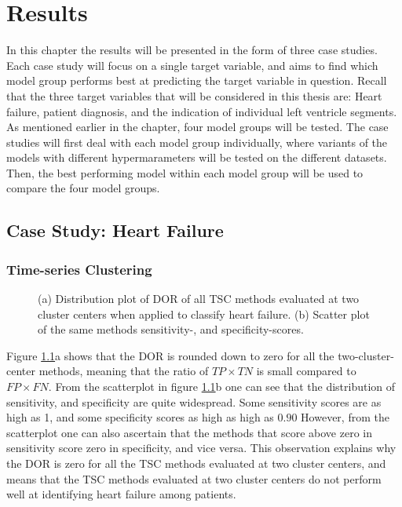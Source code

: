 \chapter{Results}

In this chapter the results will be presented in the form of three case studies. 
Each case study will focus on a single target variable, and aims to find which model group performs best at predicting the target variable in question.
Recall that the three target variables that will be considered in this thesis are: Heart failure, patient diagnosis, and the indication of individual left ventricle segments.
As mentioned earlier in the chapter, four model groups will be tested. 
The case studies will first deal with each model group individually, where variants of the models with different hypermarameters will be tested on the different datasets. 
Then, the best performing model within each model group will be used to compare the four model groups.

\section{Case Study: Heart Failure}

\subsection{Time-series Clustering}

\begin{figure}[htb]
    \centering
    
    \caption{(a) Distribution plot of DOR of all TSC methods evaluated at two cluster centers when applied to classify heart failure.
             (b) Scatter plot of the same methods sensitivity-, and specificity-scores.}
    \label{fig:tsc_hf_dor_sens_spec_dist}
\end{figure}

Figure \ref{fig:tsc_hf_dor_sens_spec_dist}a shows that the DOR is rounded down to zero for all the two-cluster-center methods, meaning that the ratio of $TP \times TN$ is small compared to $FP \times FN$. 
From the scatterplot in figure \ref{fig:tsc_hf_dor_sens_spec_dist}b one can see that the distribution of sensitivity, and specificity are quite widespread.
Some sensitivity scores are as high as 1, and some specificity scores as high as high as $0.90$
However, from the scatterplot one can also ascertain that the methods that score above zero in sensitivity score zero in specificity, and vice versa. 
This observation explains why the DOR is zero for all the TSC methods evaluated at two cluster centers, 
and means that the TSC methods evaluated at two cluster centers do not perform well at identifying heart failure among patients. \bigskip

